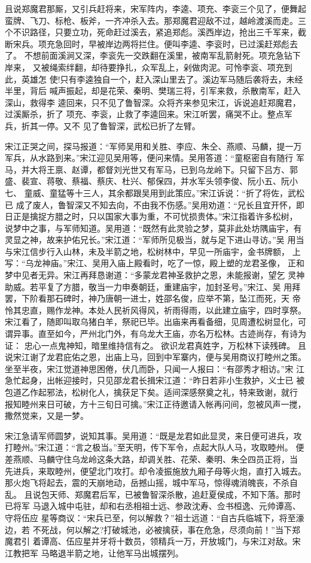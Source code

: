 且说郑魔君那厮，又引兵赶将来，宋军阵内，李逵、项充、李衮三个见了，便舞起
蛮牌、飞刀、标枪、板斧，一齐冲杀入去。那郑魔君迎敌不过，越岭渡溪而走。三
个不识路径，只要立功，死命赶过溪去，紧追郑彪。溪西岸边，抢出三千军来，截
断宋兵。项充急回时，早被岸边两将拦住。便叫李逵、李衮时，已过溪赶郑彪去了。
不想前面溪涧又深，李衮先一交跌翻在溪里，被南军乱箭射死。项充急钻下岸来，
又被绳索绊翻，却待要挣扎，众军乱上，剁做肉泥。可怜李衮、项充到此，英雄怎
使!只有李逵独自一个，赶入深山里去了。溪边军马随后袭将去，未经半里，背后
喊声振起，却是花荣、秦明、樊瑞三将，引军来救，杀散南军，赶入深山，救得李
逵回来，只不见了鲁智深。众将齐来参见宋江，诉说追赶郑魔君，过溪厮杀，折了
项充、李衮，止救了李逵回来。宋江听罢，痛哭不止。整点军兵，折其一停。又不
见了鲁智深，武松已折了左臂。

宋江正哭之间，探马报道：“军师吴用和关胜、李应、朱仝、燕顺、马麟，提一万
军兵，从水路到来。”宋江迎见吴用等，便问来情。吴用答道：“童枢密自有随行
军马，并大将王禀、赵谭，都督刘光世又有军马，已到乌龙岭下。只留下吕方、郭
盛、裴宣、蒋敬、蔡福、蔡庆、杜兴、郁保四，并水军头领李俊、阮小五、阮小七、
童威、童猛等十三人，其余都跟吴用到此策应。”宋江诉说：“折了将佐，武松已
成了废人，鲁智深又不知去向，不由我不伤感。”吴用劝道：“兄长且宜开怀，即
日正是擒捉方腊之时，只以国家大事为重，不可忧损贵体。”宋江指着许多松树，
说梦中之事，与军师知道。吴用道：“既然有此灵验之梦，莫非此处坊隅庙宇，有
灵显之神，故来护佑兄长。”宋江道：“军师所见极当，就与足下进山寻访。”吴
用当与宋江信步行入山林，未及半箭之地，松树林中，早见一所庙宇，金书牌额，
上写：“乌龙神庙。”宋江、吴用入庙上殿看时，吃了一惊，殿上塑的龙君圣像，
正和梦中见者无异。宋江再拜恳谢道：“多蒙龙君神圣救护之恩，未能报谢，望乞
灵神助威。若平复了方腊，敬当一力申奏朝廷，重建庙宇，加封圣号。”宋江、吴
用拜罢，下阶看那石碑时，神乃唐朝一进士，姓邵名俊，应举不第，坠江而死，天
帝怜其忠直，赐作龙神。本处人民祈风得风，祈雨得雨，以此建立庙宇，四时享祭。
宋江看了，随即叫取乌猪白羊，祭祀已毕。出庙来再看备细，见周遭松树显化，可
谓异事。直至如今，严州北门外，有乌龙大王庙，亦名万松林。古迹尚存，有诗为
证：
忠心一点鬼神知，暗里维持信有之。
欲识龙君真姓字，万松林下读残碑。
且说宋江谢了龙君庇佑之恩，出庙上马，回到中军寨内，便与吴用商议打睦州之策。
坐至半夜，宋江觉道神思困倦，伏几而卧，只闻一人报曰：“有邵秀才相访。”宋
江急忙起身，出帐迎接时，只见邵龙君长揖宋江道：“昨日若非小生救护，义士已
被包道乙作起邪法，松树化人，擒获足下矣。适间深感祭奠之礼，特来致谢，就行
报知睦州来日可破，方十三旬日可擒。”宋江正待邀请入帐再问间，忽被风声一搅，
撒然觉来，又是一梦。

宋江急请军师圆梦，说知其事。吴用道：“既是龙君如此显灵，来日便可进兵，攻
打睦州。”宋江道：“言之极当。”至天明，传下军令，点起大队人马，攻取睦州。
便差燕顺、马麟守住乌龙岭这条大路，却调关胜、花荣、秦明、朱仝四员正将，当
先进兵，来取睦州，便望北门攻打。却令凌振施放九厢子母等火炮，直打入城去。
那火炮飞将起去，震的天崩地动，岳撼山摇，城中军马，惊得魂消魄丧，不杀自乱。
且说包天师、郑魔君后军，已被鲁智深杀散，追赶夏侯成，不知下落。那时已将军
马退入城中屯驻，却和右丞相祖士远、参政沈寿、佥书桓逸、元帅谭高、守将伍应
星等商议：“宋兵已至，何以解救？”祖士远道：“自古兵临城下，将至濠边，若
不死战，何以解之?打破城池，必被擒获，事在危急，尽须向前！”当下郑魔君引
着谭高、伍应星并牙将十数员，领精兵一万，开放城门，与宋江对敌。宋江教把军
马略退半箭之地，让他军马出城摆列。

